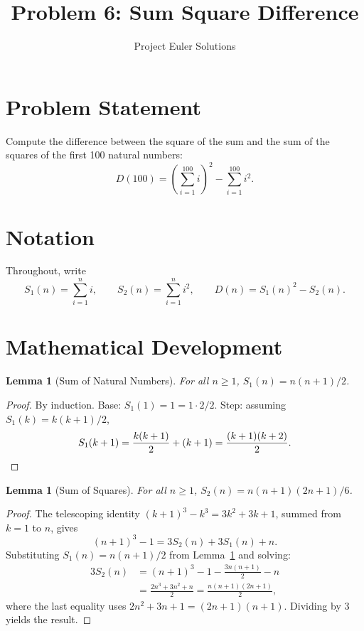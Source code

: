 \documentclass[11pt]{article}
\title{Problem 6: Sum Square Difference}
\author{Project Euler Solutions}
\date{}
\newtheorem{lemma}[theorem]{Lemma}
\begin{document}
\maketitle

\section{Problem Statement}

Compute the difference between the square of the sum and the sum of the squares of the first 100 natural numbers:
\[
D(100) = \left(\sum_{i=1}^{100} i\right)^{\!2} - \sum_{i=1}^{100} i^2.
\]

\section{Notation}

Throughout, write
\[
S_1(n) = \sum_{i=1}^{n} i, \qquad S_2(n) = \sum_{i=1}^{n} i^2, \qquad D(n) = S_1(n)^2 - S_2(n).
\]

\section{Mathematical Development}

\begin{lemma}[Sum of Natural Numbers]\label{lem:s1}
For all $n \ge 1$, \; $S_1(n) = n(n+1)/2$.
\end{lemma}

\begin{proof}
By induction. Base: $S_1(1) = 1 = 1 \cdot 2/2$. Step: assuming $S_1(k) = k(k+1)/2$,
\[
S_1(k+1) = \frac{k(k+1)}{2} + (k+1) = \frac{(k+1)(k+2)}{2}. \qedhere
\]
\end{proof}

\begin{lemma}[Sum of Squares]\label{lem:s2}
For all $n \ge 1$, \; $S_2(n) = n(n+1)(2n+1)/6$.
\end{lemma}

\begin{proof}
The telescoping identity $(k+1)^3 - k^3 = 3k^2 + 3k + 1$, summed from $k=1$ to $n$, gives
\[
(n+1)^3 - 1 = 3S_2(n) + 3S_1(n) + n.
\]
Substituting $S_1(n) = n(n+1)/2$ from Lemma~\ref{lem:s1} and solving:
\begin{align*}
3S_2(n) &= (n+1)^3 - 1 - \tfrac{3n(n+1)}{2} - n \\
        &= \frac{2n^3 + 3n^2 + n}{2} = \frac{n(n+1)(2n+1)}{2},
\end{align*}
where the last equality uses $2n^2 + 3n + 1 = (2n+1)(n+1)$. Dividing by 3 yields the result.
\end{proof}
\end{document}
